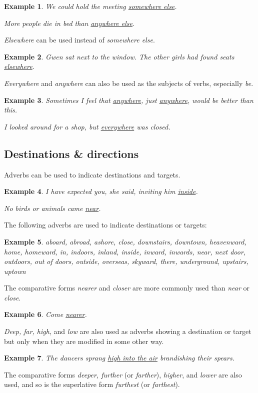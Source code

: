 \documentclass[oneside]{book}
\numberwithin{equation}{section}
\newtheorem{example}{Example}[section]
\begin{document}
\begin{example}
    We could hold the meeting \underline{somewhere else}.
    
    More people die in bed than \underline{anywhere else}.
\end{example}
\textit{Elsewhere} can be used instead of \textit{somewhere else}.
\begin{example}
    Gwen sat next to the window. The other girls had found seats \underline{elsewhere}.
\end{example}
%
\noindent{} \textit{Everywhere} and \textit{anywhere} can also be used as the subjects of verbs, especially \textit{be}.
\begin{example}
    Sometimes I feel that \underline{anywhere}, just \underline{anywhere}, would be better than this.
    
    I looked around for a shop, but \underline{everywhere} was closed.
\end{example}

\subsection{Destinations \& directions}
\noindent{} Adverbs can be used to indicate destinations and targets.
\begin{example}
    I have expected you, she said, inviting him \underline{inside}.
    
    No birds or animals came \underline{near}.
\end{example}
The following adverbs are used to indicate destinations or targets:
\begin{example}
    aboard, abroad, ashore, close, downstairs, downtown, heavenward, home, homeward, in, indoors, inland, inside, inward, inwards, near, next door, outdoors, out of doors, outside, overseas, skyward, there, underground, upstairs, uptown
\end{example}
The comparative forms \textit{nearer} and \textit{closer} are more commonly used than \textit{near} or \textit{close}.
\begin{example}
    Come \underline{nearer}.
\end{example}
\textit{Deep, far, high}, and \textit{low} are also used as adverbs showing a destination or target but only when they are modified in some other way.
\begin{example}
    The dancers sprang \underline{high into the air} brandishing their spears.
\end{example}
The comparative forms \textit{deeper, further} (or \textit{farther}), \textit{higher}, and \textit{lower} are also used, and so is the superlative form \textit{furthest} (or \textit{farthest}).
\end{document}
